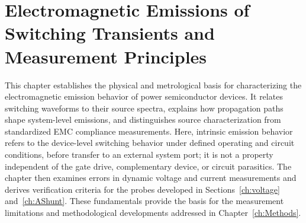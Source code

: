 \chapter{Electromagnetic Emissions of Switching Transients and Measurement Principles}
\label{ch:Fundamentals}

This chapter establishes the physical and metrological basis for characterizing the electromagnetic emission behavior of power semiconductor devices.
It relates switching waveforms to their source spectra, explains how propagation paths shape system-level emissions, and distinguishes source characterization from standardized EMC compliance measurements.
Here, intrinsic emission behavior refers to the device-level switching behavior under defined operating and circuit conditions, before transfer to an external system port; it is not a property independent of the gate drive, complementary device, or circuit parasitics.
The chapter then examines errors in dynamic voltage and current measurements and derives verification criteria for the probes developed in Sections~\ref{ch:voltage} and~\ref{ch:AShunt}.
These fundamentals provide the basis for the measurement limitations and methodological developments addressed in Chapter~\ref{ch:Methods}.




% 